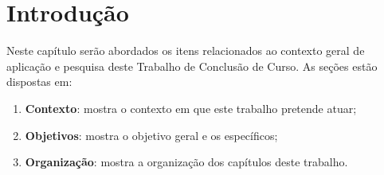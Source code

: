 \newpage\null\thispagestyle{empty}\newpage
\chapter{Introdução}
\label{chap:intro}

Neste capítulo serão abordados os itens relacionados ao contexto geral de
aplicação e pesquisa deste Trabalho de Conclusão de Curso. As seções estão
dispostas em:

\begin{enumerate}
  \item \textbf{Contexto}: mostra o contexto em que este trabalho pretende
    atuar;
  \item \textbf{Objetivos}: mostra o objetivo geral e os específicos;
  \item \textbf{Organização}: mostra a organização dos capítulos deste
    trabalho.
\end{enumerate}






